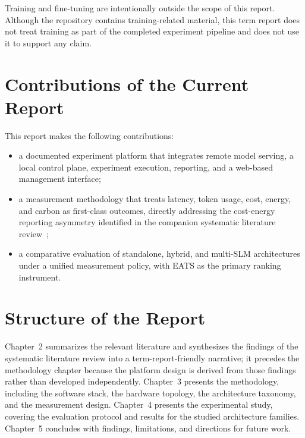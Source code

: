 Training and fine-tuning are intentionally outside the scope of this report. Although the repository contains training-related material, this term report does not treat training as part of the completed experiment pipeline and does not use it to support any claim.

\section{Contributions of the Current Report}

This report makes the following contributions:

\begin{itemize}
    \item a documented experiment platform that integrates remote model serving, a local control plane, experiment execution, reporting, and a web-based management interface;
    \item a measurement methodology that treats latency, token usage, cost, energy, and carbon as first-class outcomes, directly addressing the cost-energy reporting asymmetry identified in the companion systematic literature review~\cite{slrmanuscript2026};
    \item a comparative evaluation of standalone, hybrid, and multi-SLM architectures under a unified measurement policy, with EATS as the primary ranking instrument.
\end{itemize}

\section{Structure of the Report}

Chapter~2 summarizes the relevant literature and synthesizes the findings of the systematic literature review into a term-report-friendly narrative; it precedes the methodology chapter because the platform design is derived from those findings rather than developed independently. Chapter~3 presents the methodology, including the software stack, the hardware topology, the architecture taxonomy, and the measurement design. Chapter~4 presents the experimental study, covering the evaluation protocol and results for the studied architecture families. Chapter~5 concludes with findings, limitations, and directions for future work.
